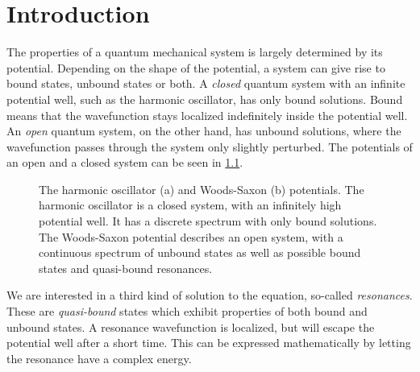 \documentclass[../main/report.tex]{subfiles}
\begin{document}
\chapter{Introduction}

The properties of a quantum mechanical system is largely determined by its potential. 
Depending on the shape of the potential, a system can give rise to bound states, unbound states or both.
A \emph{closed} quantum system with an infinite potential well, such as the harmonic oscillator, has only bound solutions. 
Bound means that the wavefunction stays localized indefinitely inside the potential well. 
An \emph{open} quantum system, on the other hand, has unbound solutions, where the wavefunction passes through the system only slightly perturbed. 
The potentials of an open and a closed system can be seen in \cref{fig:potentials}.

\begin{figure}
  \newcommand{\axes}[6]{
    \draw[->] (#2, 0) -- (#3, 0) node[right] {#1};
    \draw[->] (0, #5) -- (0, #6) node[above] {#4};
  }
  \caption{The harmonic oscillator (a) and Woods-Saxon (b) potentials. The harmonic oscillator is a closed system, with an infinitely high potential well. It has a discrete spectrum with only bound solutions. The Woods-Saxon potential describes an open system, with a continuous spectrum of unbound states as well as possible bound states and quasi-bound resonances.}
  \label{fig:potentials}
\end{figure}

We are interested in a third kind of solution to the equation, so-called \emph{resonances}. 
These are \emph{quasi-bound} states which exhibit properties of both bound and unbound states. 
A resonance wavefunction is localized, but will escape the potential well after a short time.
This can be expressed mathematically by letting the resonance have a complex energy.
\end{document}
